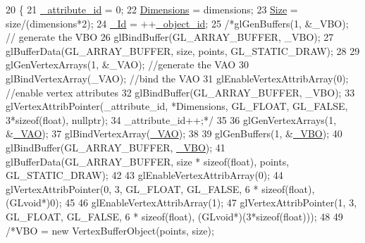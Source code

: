 \begin{DoxyCode}
20 \{
21     \mbox{\hyperlink{classEngine_1_1Components_1_1Objects_1_1VertexObject_a401aa1eb0254e57d8295c2287749eed5}{\_attribute\_id}} = 0;
22     \mbox{\hyperlink{classEngine_1_1Components_1_1Objects_1_1VertexObject_ae5bb104a878dc8a3c909ec9b0ee799c1}{Dimensions}} = dimensions;
23     \mbox{\hyperlink{classEngine_1_1Components_1_1Objects_1_1VertexObject_a13ec6e4a92520bdd1b33ad6de757cb92}{Size}} = size/(dimensions*2);
24     \mbox{\hyperlink{classEngine_1_1Components_1_1Objects_1_1VertexObject_aa76ac755e9e37853a778795f0a0ad15e}{\_Id}} = ++\mbox{\hyperlink{classEngine_1_1Components_1_1Objects_1_1VertexObject_aef076731df98a4806c644a3ac4400ae2}{\_object\_id}};
25     \textcolor{comment}{/*glGenBuffers(1, &\_VBO); // generate the VBO}
26 \textcolor{comment}{    glBindBuffer(GL\_ARRAY\_BUFFER, \_VBO);}
27 \textcolor{comment}{    glBufferData(GL\_ARRAY\_BUFFER, size, points, GL\_STATIC\_DRAW);}
28 \textcolor{comment}{}
29 \textcolor{comment}{    glGenVertexArrays(1, &\_VAO); //generate the VAO}
30 \textcolor{comment}{    glBindVertexArray(\_VAO); //bind the VAO}
31 \textcolor{comment}{    glEnableVertexAttribArray(0); //enable vertex attributes}
32 \textcolor{comment}{    glBindBuffer(GL\_ARRAY\_BUFFER, \_VBO);}
33 \textcolor{comment}{    glVertexAttribPointer(\_attribute\_id, *Dimensions, GL\_FLOAT, GL\_FALSE, 3*sizeof(float), nullptr);}
34 \textcolor{comment}{    \_attribute\_id++;*/}
35 
36     glGenVertexArrays(1, &\mbox{\hyperlink{classEngine_1_1Components_1_1Objects_1_1VertexObject_ae85ac9d5ded8f54d58feb7fb78e75130}{\_VAO}});
37     glBindVertexArray(\mbox{\hyperlink{classEngine_1_1Components_1_1Objects_1_1VertexObject_ae85ac9d5ded8f54d58feb7fb78e75130}{\_VAO}});
38 
39     glGenBuffers(1, &\mbox{\hyperlink{classEngine_1_1Components_1_1Objects_1_1VertexObject_a79e171ffe4b9342d76c0c729a9836fd2}{\_VBO}});
40     glBindBuffer(GL\_ARRAY\_BUFFER, \mbox{\hyperlink{classEngine_1_1Components_1_1Objects_1_1VertexObject_a79e171ffe4b9342d76c0c729a9836fd2}{\_VBO}});
41     glBufferData(GL\_ARRAY\_BUFFER, size * \textcolor{keyword}{sizeof}(\textcolor{keywordtype}{float}), points, GL\_STATIC\_DRAW);
42 
43     glEnableVertexAttribArray(0);
44     glVertexAttribPointer(0, 3, GL\_FLOAT, GL\_FALSE, 6 * \textcolor{keyword}{sizeof}(\textcolor{keywordtype}{float}), (GLvoid*)0);
45 
46     glEnableVertexAttribArray(1);
47     glVertexAttribPointer(1, 3, GL\_FLOAT, GL\_FALSE, 6 * \textcolor{keyword}{sizeof}(\textcolor{keywordtype}{float}), (GLvoid*)(3*\textcolor{keyword}{sizeof}(\textcolor{keywordtype}{float})));
48 
49     \textcolor{comment}{/*VBO = new VertexBufferObject(points, size);}

\end{DoxyCode}
